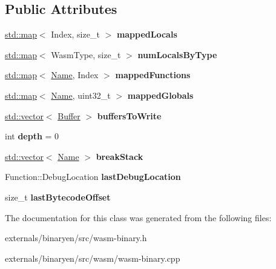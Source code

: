 \subsection*{Public Attributes}
\begin{DoxyCompactItemize}
\item 
\mbox{\label{classwasm_1_1_wasm_binary_writer_a6d77f1fa648ada4136d3d7740d45f30c}} 
\mbox{\hyperlink{classstd_1_1map}{std\+::map}}$<$ Index, size\+\_\+t $>$ {\bfseries mapped\+Locals}
\item 
\mbox{\label{classwasm_1_1_wasm_binary_writer_a55bfe4c787a36dc88068add5417f93f4}} 
\mbox{\hyperlink{classstd_1_1map}{std\+::map}}$<$ Wasm\+Type, size\+\_\+t $>$ {\bfseries num\+Locals\+By\+Type}
\item 
\mbox{\label{classwasm_1_1_wasm_binary_writer_a0db2184bd063532a99307ae6ca16701a}} 
\mbox{\hyperlink{classstd_1_1map}{std\+::map}}$<$ \mbox{\hyperlink{structwasm_1_1_name}{Name}}, Index $>$ {\bfseries mapped\+Functions}
\item 
\mbox{\label{classwasm_1_1_wasm_binary_writer_a161d01603f731a4226262d9c42a285e2}} 
\mbox{\hyperlink{classstd_1_1map}{std\+::map}}$<$ \mbox{\hyperlink{structwasm_1_1_name}{Name}}, uint32\+\_\+t $>$ {\bfseries mapped\+Globals}
\item 
\mbox{\label{classwasm_1_1_wasm_binary_writer_a38edcee13f2383bac2e389ea30f3deaa}} 
\mbox{\hyperlink{classstd_1_1vector}{std\+::vector}}$<$ \mbox{\hyperlink{structwasm_1_1_wasm_binary_writer_1_1_buffer}{Buffer}} $>$ {\bfseries buffers\+To\+Write}
\item 
\mbox{\label{classwasm_1_1_wasm_binary_writer_afaf0ae5adc448d5a9d0ad5537dc1ef41}} 
int {\bfseries depth} = 0
\item 
\mbox{\label{classwasm_1_1_wasm_binary_writer_a47f817eb1aae2c33e92ba8579dfeeaab}} 
\mbox{\hyperlink{classstd_1_1vector}{std\+::vector}}$<$ \mbox{\hyperlink{structwasm_1_1_name}{Name}} $>$ {\bfseries break\+Stack}
\item 
\mbox{\label{classwasm_1_1_wasm_binary_writer_a254aba8666dbaf3096cf899757872193}} 
Function\+::\+Debug\+Location {\bfseries last\+Debug\+Location}
\item 
\mbox{\label{classwasm_1_1_wasm_binary_writer_a2c2c833e4bd60c590939a1a1ca3996ba}} 
size\+\_\+t {\bfseries last\+Bytecode\+Offset}
\end{DoxyCompactItemize}


The documentation for this class was generated from the following files\+:\begin{DoxyCompactItemize}
\item 
externals/binaryen/src/wasm-\/binary.\+h\item 
externals/binaryen/src/wasm/wasm-\/binary.\+cpp\end{DoxyCompactItemize}
